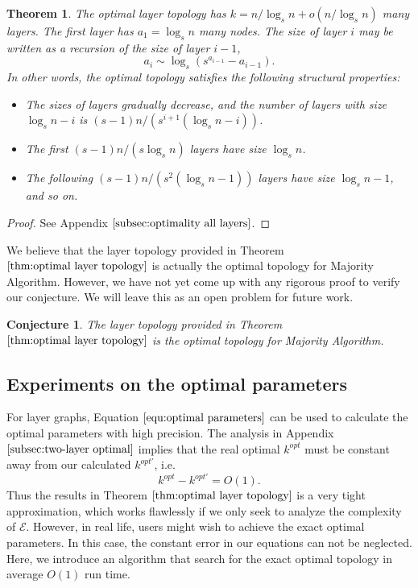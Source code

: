\documentclass[a4paper,UKenglish]{lipics}
\newtheorem{thm}{Theorem}[section] %
\newtheorem{cjt}{Conjecture}
\theoremstyle{definition}
\begin{document}
\begin{thm}
\label{thm:optimal layer topology}
The optimal layer topology has $k = n/\log_s n + o(n/\log_s n)$ many layers.
The first layer has $a_1 = \log_{s}n$ many nodes.
The size of layer $i$ may be written as a recursion of the size of layer $i-1$,
\begin{equation}
\label{equ:optimal parameters}
	a_i
	\sim
	\log_s(s^{a_{i-1}}-a_{i-1}).
\end{equation}
In other words, the optimal topology satisfies the following structural properties:
\begin{itemize}
\item The sizes of layers gradually decrease, and the number of layers with size $\log_s n - i$ is ${(s-1)n / (s^{i+1}(\log_{s}n - i))}$. 
\item The first ${(s-1)n / (s\log_{s}n)}$ layers have size $\log_{s} n$.
\item The following ${(s-1)n / (s^{2}(\log_{s}n - 1))}$ layers have size $\log_s n - 1$, and so on.
\end{itemize}
\end{thm}

\begin{proof}
See Appendix $\ref{subsec:optimality all layers}$.
\end{proof}

We believe that the layer topology provided in Theorem $\ref{thm:optimal layer topology}$ is
	actually the optimal topology for Majority Algorithm.
However, we have not yet come up with any rigorous proof to verify our conjecture. 
We will leave this as an open problem for future work.
\begin{cjt}
\label{cjt:open problems}
The layer topology provided in Theorem $\ref{thm:optimal layer topology}$ is
	the optimal topology for Majority Algorithm.
\end{cjt}



\subsection {Experiments on the optimal parameters}

For layer graphs, Equation $\eqref{equ:optimal parameters}$ can be used to calculate the optimal parameters with high precision. 
The analysis in Appendix $\ref{subsec:two-layer optimal}$ implies that the real optimal $k^{opt}$ must be constant away from our calculated $k^{opt'}$, i.e.
\begin{equation*}
	k^{opt} - k^{opt'} 
= 
	O(1).
\end{equation*}
Thus the results in Theorem $\ref{thm:optimal layer topology}$ is a very tight approximation, which works flawlessly 
	if we only seek to analyze the complexity of $\mathcal{E}$. 
However, in real life, users might wish to achieve the exact optimal parameters. 
In this case, the constant error in our equations can not be neglected. 
Here, we introduce an algorithm that search for the exact optimal topology in average $O(1)$ run time.
\end{document}

